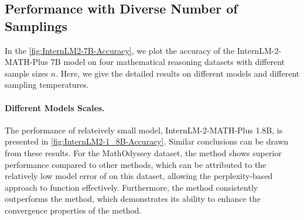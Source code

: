 \subsection{Performance with Diverse Number of Samplings}

In the \autoref{fig:InternLM2-7B-Accuracy}, we plot the accuracy of the InternLM-2-MATH-Plus 7B model on four mathematical reasoning datasets with different sample sizes $n$. Here, we give the detailed results on different models and different sampling temperatures.

\paragraph{Different Models Scales.} 
The performance of relateively small model, InternLM-2-MATH-Plus 1.8B, is presented in \autoref{fig:InternLM2-1_8B-Accuracy}.  Similar conclusions can be drawn from these results. For the MathOdyssey dataset, the \PP method shows superior performance compared to other methods, which can be attributed to the relatively low model error of \PP on this dataset, allowing the perplexity-based approach to function effectively. Furthermore, the \RPC method consistently outperforms the \SC method, which demonstrates its ability to enhance the convergence properties of the \SC method. 

